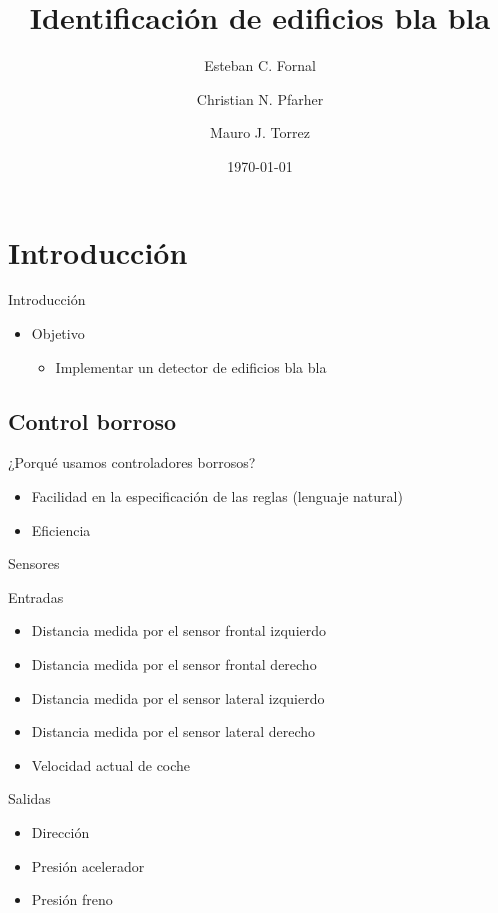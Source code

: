 \documentclass[spanish]{beamer}
\title{Identificación de edificios bla bla}
\author{Esteban C. Fornal \and Christian N. Pfarher \and Mauro J. Torrez}
\date{\today}
\begin{document}
%
\frame{\titlepage}

\section[Outline]{Introducción}
\begin{frame}{Introducción}
\begin{itemize}
\item<1-> Objetivo
\begin{itemize}
\item Implementar un detector de edificios bla bla
\end{itemize}
\end{itemize}
\end{frame}

\subsection[Outline]{Control borroso}
\begin{frame}{¿Porqué usamos controladores borrosos?}
\begin{itemize}
\item<1-> Facilidad en la especificación de las reglas (lenguaje natural)
\item<2-> Eficiencia
\end{itemize}
\end{frame}

\begin{frame}{Sensores}
\end{frame}

\begin{frame}{Entradas}
  \begin{itemize}
  \item Distancia medida por el sensor frontal izquierdo
  \item Distancia medida por el sensor frontal derecho
  \item Distancia medida por el sensor lateral izquierdo
  \item Distancia medida por el sensor lateral derecho
  \item Velocidad actual de coche
  \end{itemize}
\end{frame}
\begin{frame}{Salidas}
  \begin{itemize}
  \item Dirección %
  \item Presión acelerador %
  \item Presión freno%
  \end{itemize}
\end{frame}
\end{document}
